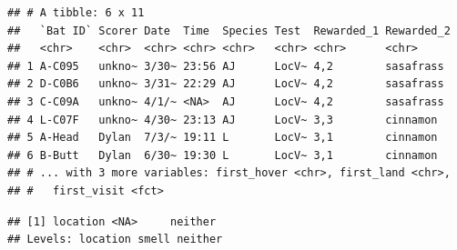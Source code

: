 \documentclass[]{article}
\newenvironment{Shaded}{\begin{snugshade}}{\end{snugshade}}
\newcommand{\KeywordTok}[1]{\textcolor[rgb]{0.13,0.29,0.53}{\textbf{{#1}}}}
\newcommand{\DataTypeTok}[1]{\textcolor[rgb]{0.13,0.29,0.53}{{#1}}}
\newcommand{\StringTok}[1]{\textcolor[rgb]{0.31,0.60,0.02}{{#1}}}
\newcommand{\CommentTok}[1]{\textcolor[rgb]{0.56,0.35,0.01}{\textit{{#1}}}}
\newcommand{\NormalTok}[1]{{#1}}
\begin{document}
\begin{Shaded}
\end{Shaded}

\begin{verbatim}
## # A tibble: 6 x 11
##   `Bat ID` Scorer Date  Time  Species Test  Rewarded_1 Rewarded_2
##   <chr>    <chr>  <chr> <chr> <chr>   <chr> <chr>      <chr>     
## 1 A-C095   unkno~ 3/30~ 23:56 AJ      LocV~ 4,2        sasafrass 
## 2 D-C0B6   unkno~ 3/31~ 22:29 AJ      LocV~ 4,2        sasafrass 
## 3 C-C09A   unkno~ 4/1/~ <NA>  AJ      LocV~ 4,2        sasafrass 
## 4 L-C07F   unkno~ 4/30~ 23:13 AJ      LocV~ 3,3        cinnamon  
## 5 A-Head   Dylan  7/3/~ 19:11 L       LocV~ 3,1        cinnamon  
## 6 B-Butt   Dylan  6/30~ 19:30 L       LocV~ 3,1        cinnamon  
## # ... with 3 more variables: first_hover <chr>, first_land <chr>,
## #   first_visit <fct>
\end{verbatim}

\begin{Shaded}
\end{Shaded}

\begin{verbatim}
## [1] location <NA>     neither 
## Levels: location smell neither
\end{verbatim}
\end{document}
